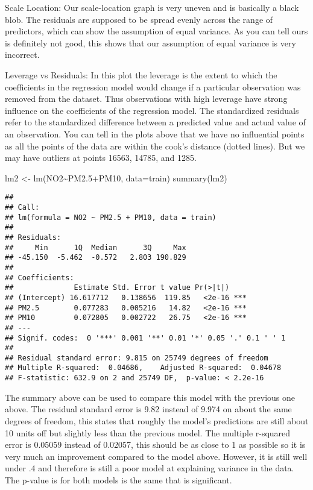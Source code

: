 \documentclass[
]{article}
\newenvironment{Shaded}{\begin{snugshade}}{\end{snugshade}}
\newcommand{\AttributeTok}[1]{\textcolor[rgb]{0.77,0.63,0.00}{#1}}
\newcommand{\FloatTok}[1]{\textcolor[rgb]{0.00,0.00,0.81}{#1}}
\newcommand{\FunctionTok}[1]{\textcolor[rgb]{0.00,0.00,0.00}{#1}}
\newcommand{\NormalTok}[1]{#1}
\newcommand{\OtherTok}[1]{\textcolor[rgb]{0.56,0.35,0.01}{#1}}
\newcommand{\SpecialCharTok}[1]{\textcolor[rgb]{0.00,0.00,0.00}{#1}}
\begin{document}
Scale Location: Our scale-location graph is very uneven and is basically
a black blob. The residuals are supposed to be spread evenly across the
range of predictors, which can show the assumption of equal variance. As
you can tell ours is definitely not good, this shows that our assumption
of equal variance is very incorrect.

Leverage vs Residuals: In this plot the leverage is the extent to which
the coefficients in the regression model would change if a particular
observation was removed from the dataset. Thus observations with high
leverage have strong influence on the coefficients of the regression
model. The standardized residuals refer to the standardized difference
between a predicted value and actual value of an observation. You can
tell in the plots above that we have no influential points as all the
points of the data are within the cook's distance (dotted lines). But we
may have outliers at points 16563, 14785, and 1285.

\begin{Shaded}
\begin{Highlighting}[]
\NormalTok{lm2 }\OtherTok{\textless{}{-}} \FunctionTok{lm}\NormalTok{(NO2}\SpecialCharTok{\textasciitilde{}}\NormalTok{PM2}\FloatTok{.5}\SpecialCharTok{+}\NormalTok{PM10, }\AttributeTok{data=}\NormalTok{train)}
\FunctionTok{summary}\NormalTok{(lm2)}
\end{Highlighting}
\end{Shaded}

\begin{verbatim}
## 
## Call:
## lm(formula = NO2 ~ PM2.5 + PM10, data = train)
## 
## Residuals:
##     Min      1Q  Median      3Q     Max 
## -45.150  -5.462  -0.572   2.803 190.829 
## 
## Coefficients:
##              Estimate Std. Error t value Pr(>|t|)    
## (Intercept) 16.617712   0.138656  119.85   <2e-16 ***
## PM2.5        0.077283   0.005216   14.82   <2e-16 ***
## PM10         0.072805   0.002722   26.75   <2e-16 ***
## ---
## Signif. codes:  0 '***' 0.001 '**' 0.01 '*' 0.05 '.' 0.1 ' ' 1
## 
## Residual standard error: 9.815 on 25749 degrees of freedom
## Multiple R-squared:  0.04686,    Adjusted R-squared:  0.04678 
## F-statistic: 632.9 on 2 and 25749 DF,  p-value: < 2.2e-16
\end{verbatim}

The summary above can be used to compare this model with the previous
one above. The residual standard error is 9.82 instead of 9.974 on about
the same degrees of freedom, this states that roughly the model's
predictions are still about 10 units off but slightly less than the
previous model. The multiple r-squared error is 0.05059 instead of
0.02057, this should be as close to 1 as possible so it is very much an
improvement compared to the model above. However, it is still well under
.4 and therefore is still a poor model at explaining variance in the
data. The p-value is for both models is the same that is significant.
\end{document}
